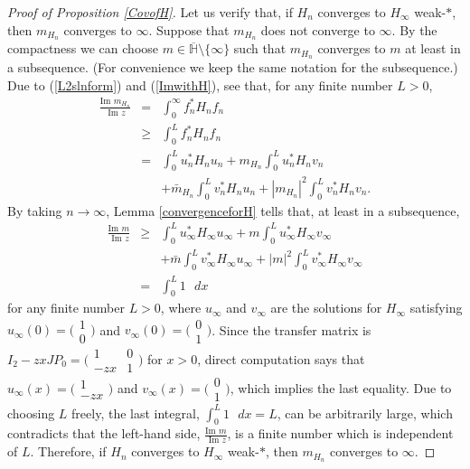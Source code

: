 \documentclass[preprint,12pt]{elsarticle}
\begin{document}
\begin{proof}[Proof of Proposition \ref{CovofH}]
Let us verify that,  if $H_n$ converges to $H_{\infty}$ weak-$*$, then $m_{H_n}$ converges to $\infty$. Suppose that $m_{H_n}$ does not converge to $\infty$. By the compactness we can choose $m\in\overline{\mathbb{H}}\setminus \{ \infty \} $ such that $m_{H_n}$ converges to $m$ at least in a subsequence. (For convenience we keep the same notation for the subsequence.)  Due to (\ref{L2slnform}) and (\ref{ImwithH}), see that, for any finite number $L>0$, 
\begin{eqnarray*}
\frac{\textrm{Im } m_{H_n}}{\textrm{ Im }z}
&=&\int_0^{\infty}f_n^*H_nf_n\\
&\ge& \int_0^{L}f_n^*H_nf_n\\
&=& \int_0^{L} u_n^* H_n u_n+m_{H_n}\int_0^{L} u_n^* H_n v_n\\
&& +\bar{m}_{H_n}\int_0^{L} v_n^* H_n u_n+|m_{H_n}|^2\int_0^{L} v_n^* H_n v_n.
\end{eqnarray*}
By taking $n\to\infty$, Lemma \ref{convergenceforH} tells that, at least in a subsequence, 
\begin{eqnarray*}
\frac{\textrm{Im } m}{\textrm{ Im }z}
&\ge&  \int_0^{L} u_{\infty}^* H_{\infty} u_{\infty}+m \int_0^{L} u_{\infty}^* H_{\infty} v_{\infty}\\
&& +\bar{m}\int_0^{L} v_{\infty}^* H_{\infty} u_{\infty}+|m|^2\int_0^{L} v_{\infty}^* H_{\infty} v_{\infty}\\
&=&\int_0^L 1 \textrm{ }dx
\end{eqnarray*}
for any finite number $L>0$, where $u_{\infty}$ and $v_{\infty}$ are the solutions for $H_{\infty}$ satisfying $u_{\infty}(0)=\big( \begin{smallmatrix} 1 \\ 0 \end{smallmatrix}\big)$ and $v_{\infty}(0)=\big( \begin{smallmatrix} 0 \\ 1 \end{smallmatrix}\big)$. Since the transfer matrix is $I_2-zxJP_0=\big(\begin{smallmatrix} 1&0\\-zx&1 \end{smallmatrix}\big)$ for $x>0$, direct computation says that $u_{\infty}(x)=\big( \begin{smallmatrix} 1 \\ -zx \end{smallmatrix}\big)$ and $v_{\infty}(x)=\big( \begin{smallmatrix} 0 \\ 1 \end{smallmatrix}\big)$, which implies the last equality. Due to choosing $L$ freely, the last integral, $\int_0^L 1\textrm{ } dx=L$, can be arbitrarily large, which contradicts that the left-hand side, $\frac{\textrm{Im } m}{\textrm{ Im }z}$, is a finite number which is independent of $L$. Therefore,  if $H_n$ converges to $H_{\infty}$ weak-$*$, then $m_{H_n}$ converges to $\infty$.


\end{proof}
\end{document}
